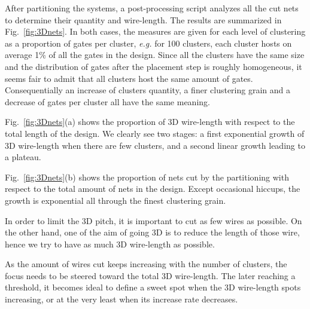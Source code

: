 \documentclass[conference]{IEEEtran}
\begin{document}


After partitioning the systems, a post-processing script analyzes all the cut nets to determine their quantity and wire-length.
The results are summarized in Fig.~\ref{fig:3Dnets}.
In both cases, the measures are given for each level of clustering as a proportion of gates per cluster, \textit{e.g.} for 100 clusters, each cluster hosts on average 1\% of all the gates in the design.
Since all the clusters have the same size and the distribution of gates after the placement step is roughly homogeneous, it seems fair to admit that all clusters host the same amount of gates.
Consequentially an increase of clusters quantity, a finer clustering grain and a decrease of gates per cluster all have the same meaning.

Fig.~\ref{fig:3Dnets}(a) shows the proportion of 3D wire-length with respect to the total length of the design.
We clearly see two stages: a first exponential growth of 3D wire-length when there are few clusters, and a second linear growth leading to a plateau.

Fig.~\ref{fig:3Dnets}(b) shows the proportion of nets cut by the partitioning with respect to the total amount of nets in the design.
Except occasional hiccups, the growth is exponential all through the finest clustering grain.

In order to limit the 3D pitch, it is important to cut as few wires as possible.
On the other hand, one of the aim of going 3D is to reduce the length of those wire, hence we try to have as much 3D wire-length as possible.

As the amount of wires cut keeps increasing with the number of clusters, the focus needs to be steered toward the total 3D wire-length.
The later reaching a threshold, it becomes ideal to define a sweet spot when the 3D wire-length spots increasing, or at the very least when its increase rate decreases.
\end{document}
